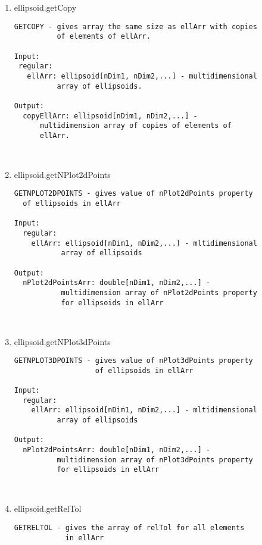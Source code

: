 \begin{enumerate}
\begin{lstlisting}
\end{lstlisting}
\fontfamily{\familydefault}
\selectfont
\item {ellipsoid.getCopy}
\selectfont
\begin{lstlisting}
GETCOPY - gives array the same size as ellArr with copies
          of elements of ellArr.

Input:
 regular:
   ellArr: ellipsoid[nDim1, nDim2,...] - multidimensional
          array of ellipsoids.

Output:
  copyEllArr: ellipsoid[nDim1, nDim2,...] -
      multidimension array of copies of elements of
      ellArr.



\end{lstlisting}
\fontfamily{\familydefault}
\selectfont
\item {ellipsoid.getNPlot2dPoints}
\selectfont
\begin{lstlisting}
GETNPLOT2DPOINTS - gives value of nPlot2dPoints property
  of ellipsoids in ellArr

Input:
  regular:
    ellArr: ellipsoid[nDim1, nDim2,...] - mltidimensional
           array of ellipsoids

Output:
  nPlot2dPointsArr: double[nDim1, nDim2,...] -
           multidimension array of nPlot2dPoints property
           for ellipsoids in ellArr



\end{lstlisting}
\fontfamily{\familydefault}
\selectfont
\item {ellipsoid.getNPlot3dPoints}
\selectfont
\begin{lstlisting}
GETNPLOT3DPOINTS - gives value of nPlot3dPoints property
                   of ellipsoids in ellArr

Input:
  regular:
    ellArr: ellipsoid[nDim1, nDim2,...] - mltidimensional
          array of ellipsoids

Output:
  nPlot2dPointsArr: double[nDim1, nDim2,...] -
          multidimension array of nPlot3dPoints property
          for ellipsoids in ellArr



\end{lstlisting}
\fontfamily{\familydefault}
\selectfont
\item {ellipsoid.getRelTol}
\selectfont
\begin{lstlisting}
GETRELTOL - gives the array of relTol for all elements
            in ellArr


\end{lstlisting}
\end{enumerate}
